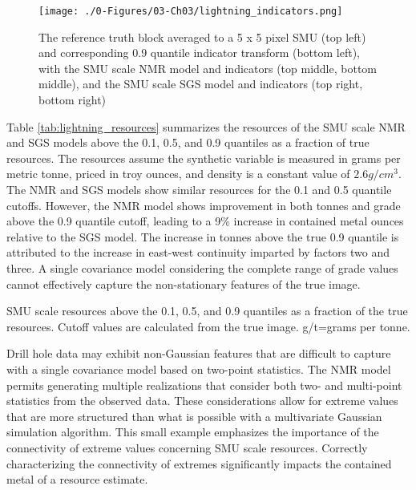 \begin{figure}[htb!]
    \centering
    \texttt{[image: ./0-Figures/03-Ch03/lightning\_indicators.png]}
    \caption{The reference truth block averaged to a 5 x 5 pixel \gls{SMU} (top left) and corresponding 0.9 quantile indicator transform (bottom left), with the \gls{SMU} scale \gls{NMR} model and indicators (top middle, bottom middle), and the \gls{SMU} scale \gls{SGS} model and indicators (top right, bottom right)}
    \label{fig:lightning_indicators}
\end{figure}

Table \ref{tab:lightning_resources} summarizes the resources of the \gls{SMU} scale \gls{NMR} and \gls{SGS} models above the 0.1, 0.5, and 0.9 quantiles as a fraction of true resources. The resources assume the synthetic variable is measured in grams per metric tonne, priced in troy ounces, and density is a constant value of $2.6 g/cm^{3}$. The \gls{NMR} and \gls{SGS} models show similar resources for the 0.1 and 0.5 quantile cutoffs. However, the  \gls{NMR} model shows improvement in both tonnes and grade above the 0.9 quantile cutoff, leading to a 9\% increase in contained metal ounces relative to the \gls{SGS} model. The increase in tonnes above the true 0.9 quantile is attributed to the increase in east-west continuity imparted by factors two and three. A single covariance model considering the complete range of grade values cannot effectively capture the non-stationary features of the true image.

\begin{table}[!htb]
    \centering
    \caption{\Gls{SMU} scale resources above the 0.1, 0.5, and 0.9 quantiles as a fraction of the true resources. Cutoff values are calculated from the true image. g/t=grams per tonne.}
    \resizebox{1\width}{!}{}
    \label{tab:lightning_resources}
\end{table}

Drill hole data may exhibit non-Gaussian features that are difficult to capture with a single covariance model based on two-point statistics. The \gls{NMR} model permits generating multiple realizations that consider both two- and multi-point statistics from the observed data. These considerations allow for extreme values that are more structured than what is possible with a multivariate Gaussian simulation algorithm. This small example emphasizes the importance of the connectivity of extreme values concerning \gls{SMU} scale resources. Correctly characterizing the connectivity of extremes significantly impacts the contained metal of a resource estimate.

